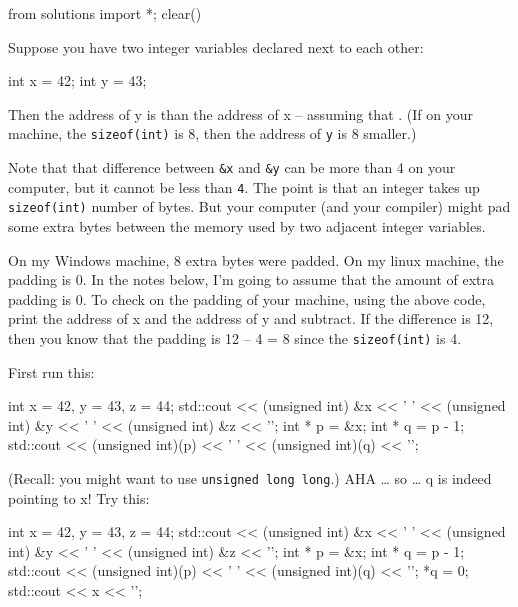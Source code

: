 \begin{python0}
from solutions import *; clear()
\end{python0}

Suppose you have two integer variables declared next to each other:

\begin{consolethree}[escapeinside=||]
int x = 42;
int y = 43;
\end{consolethree}

Then the address of y is  than the address of x -- assuming that \texttt{}. (If on your machine, the \texttt{sizeof(int)} is 8, then the address of \texttt{y} is 8 smaller.)

 Note that that difference between \texttt{\&x} and \texttt{\&y} can be more than 4 on your computer, but it cannot be less than \texttt{4}. The point is that an integer takes up \texttt{sizeof(int)} number of bytes. But your computer (and your compiler) might pad some extra bytes between the memory used by two adjacent integer variables.

On my Windows machine, 8 extra bytes were padded. On my linux machine, the padding is 0. In the notes below, I'm going to assume that the amount of extra padding is 0. To check on the padding of your machine, using the above code, print the address of x and the address of y and subtract. If the difference is 12, then you know that the padding is 12 -- 4 = 8 since the \texttt{sizeof(int)} is 4.

First run this:

\begin{consolethree}[escapeinside=||]
int x = 42, y = 43, z = 44;
std::cout << (unsigned int) &x << ' '
          << (unsigned int) &y << ' '
          << (unsigned int) &z << '\n';
int * p = &x;
int * q = p - 1;
std::cout << (unsigned int)(p) << ' '
          << (unsigned int)(q) << '\n';
\end{consolethree}

(Recall: you might want to use \texttt{unsigned long long}.) AHA \ldots{} so \ldots{} q is indeed pointing to x! Try this:

\begin{consolethree}[escapeinside=||]
int x = 42, y = 43, z = 44;
std::cout << (unsigned int) &x << ' '
          << (unsigned int) &y << ' '
          << (unsigned int) &z << '\n';
int * p = &x;
int * q = p - 1;
std::cout << (unsigned int)(p) << ' '
          << (unsigned int)(q) << '\n';
*q = 0;
std::cout << x << '\n';
\end{consolethree}

